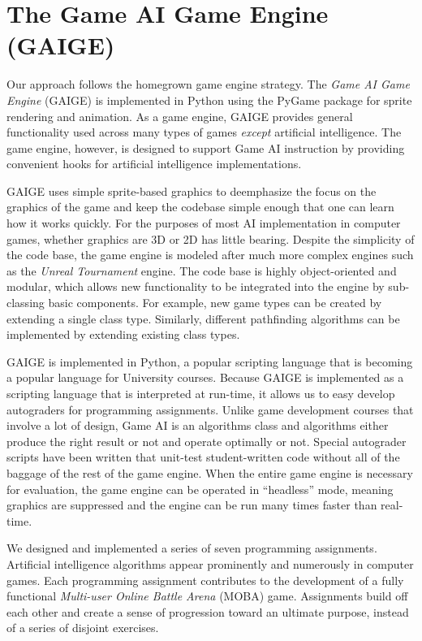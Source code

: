 \documentclass[letterpaper]{article}
\begin{document}
\section{The Game AI Game Engine (GAIGE)}



Our approach follows the homegrown game engine strategy.
The {\em Game AI Game Engine} (GAIGE) is implemented in Python using the PyGame package for sprite rendering and animation. 
As a game engine, GAIGE provides general functionality used across many types of games {\em except} artificial intelligence.
The game engine, however, is designed to support Game AI instruction by providing convenient hooks for artificial intelligence implementations.

GAIGE uses simple sprite-based graphics to deemphasize the focus on the graphics of the game and keep the codebase simple enough that one can learn how it works quickly. 
For the purposes of most AI implementation in computer games, whether graphics are 3D or 2D has little bearing. 
Despite the simplicity of the code base, the game engine is modeled after much more complex engines such as the {\em Unreal Tournament} engine.
The code base is highly object-oriented and modular, which allows new functionality to be integrated into the engine by sub-classing basic components. 
For example, new game types can be created by extending a single class type.
Similarly, different pathfinding algorithms can be implemented by extending existing class types.

GAIGE is implemented in Python, a popular scripting language that is becoming a popular language for University courses.
Because GAIGE is implemented as a scripting language that is interpreted at run-time, it allows us to easy develop autograders for programming assignments.
Unlike game development courses that involve a lot of design, Game AI is an algorithms class and algorithms either produce the right result or not and operate optimally or not.
Special autograder scripts have been written that unit-test student-written code without all of the baggage of the rest of the game engine.
When the entire game engine is necessary for evaluation, the game engine can be operated in ``headless'' mode, meaning graphics are suppressed and the engine can be run many times faster than real-time.

We designed and implemented a series of seven programming assignments. 
Artificial intelligence algorithms appear prominently and numerously in computer games.
Each programming assignment contributes to the development of a fully functional {\em Multi-user Online Battle Arena} (MOBA) game.
Assignments build off each other and create a sense of progression toward an ultimate purpose, instead of a series of disjoint exercises. 
 
\end{document}
